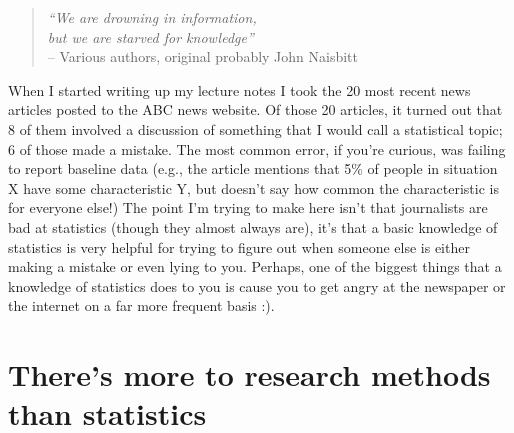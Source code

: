 \documentclass[]{book}
\begin{document}
\begin{quote}
\emph{``We are drowning in information,\\
but we are starved for knowledge''}\\

-- Various authors, original probably John Naisbitt
\end{quote}

When I started writing up my lecture notes I took the 20 most recent news articles posted to the ABC news website. Of those 20 articles, it turned out that 8 of them involved a discussion of something that I would call a statistical topic; 6 of those made a mistake. The most common error, if you're curious, was failing to report baseline data (e.g., the article mentions that 5\% of people in situation X have some characteristic Y, but doesn't say how common the characteristic is for everyone else!) The point I'm trying to make here isn't that journalists are bad at statistics (though they almost always are), it's that a basic knowledge of statistics is very helpful for trying to figure out when someone else is either making a mistake or even lying to you. Perhaps, one of the biggest things that a knowledge of statistics does to you is cause you to get angry at the newspaper or the internet on a far more frequent basis :).

\hypertarget{theres-more-to-research-methods-than-statistics}{%
\section{There's more to research methods than statistics}\label{theres-more-to-research-methods-than-statistics}}
\end{document}
